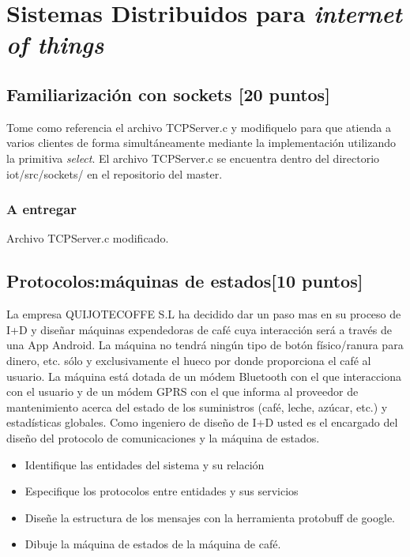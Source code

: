 \chapter{Sistemas Distribuidos para \emph{internet of things}}

\section{Familiarización con sockets [20 puntos]}

Tome como referencia el archivo TCPServer.c y modifiquelo para que atienda a varios clientes de forma simultáneamente mediante la implementación utilizando la primitiva \emph{select}. El archivo TCPServer.c se encuentra dentro del directorio iot/src/sockets/ en el repositorio del master.

\subsection{A entregar}
Archivo TCPServer.c modificado.

\section{Protocolos:máquinas de estados[10 puntos]}

La empresa QUIJOTECOFFE S.L ha decidido dar un paso mas en su proceso de I+D
y diseñar máquinas expendedoras de café cuya interacción será a través de una App Android. La máquina no tendrá ningún tipo de botón físico/ranura para dinero, etc. sólo y exclusivamente el hueco por donde proporciona el café al usuario. La máquina está dotada de un módem Bluetooth con el que interacciona con el usuario y de un módem GPRS con el que informa al proveedor de mantenimiento acerca del estado de los suministros (café, leche, azúcar, etc.) y estadísticas globales. Como ingeniero de diseño de I+D usted es el encargado del diseño del protocolo de comunicaciones y la máquina de estados.
\begin{itemize}
\item Identifique las entidades del sistema y su relación
\item Especifique los protocolos entre entidades y sus servicios
\item Diseñe la estructura de los mensajes con la herramienta protobuff de google.
\item Dibuje la máquina de estados de la máquina de café. 
\end{itemize}

